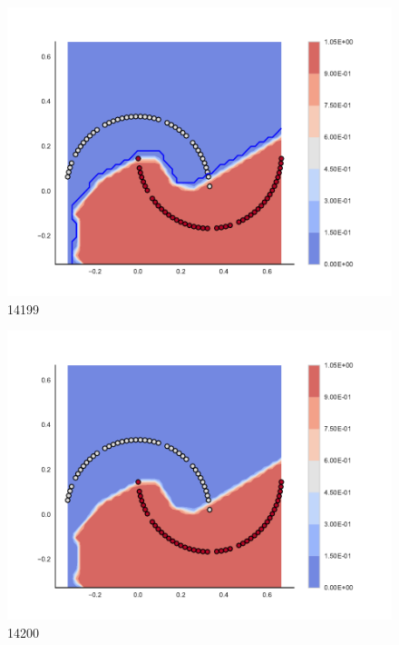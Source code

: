 \begin{subfigure}[b]{0.09\textwidth}
    \includegraphics[clip, trim=2.35cm 1.75cm 4.5cm 0cm,width=\textwidth]{img/convergence/14199.pdf}
    \caption{14199}
    \label{fig:convergence_14199}
\end{subfigure}
%
\begin{subfigure}[b]{0.09\textwidth}
    \includegraphics[clip, trim=2.35cm 1.75cm 4.5cm 0cm,width=\textwidth]{img/convergence/14200.pdf}
    \caption{14200}
    \label{fig:convergence_14200}
\end{subfigure}
%
